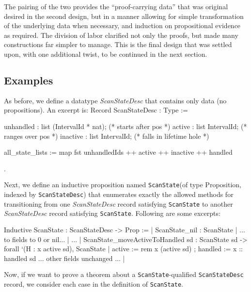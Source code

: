 \documentclass{llncs}
\newenvironment{MyCoqUneval}{\small \verbatim}{\endverbatim \normalsize}
\begin{document}
The pairing of the two provides the ``proof-carrying data'' that
was original desired in the second design, but in a manner allowing for simple
transformation of the underlying data when necessary, and induction on
propositional evidence as required.  The division of labor clarified not only
the proofs, but made many constructions far simpler to manage.  This is the
final design that was settled upon, with one additional twist, to be continued
in the next section.

\subsection{Examples}
\label{sec:examplesv3}

As before, we define a datatype \emph{ScanStateDesc} that contains
only data (no propositions). An excerpt is:
\begin{MyCoqUneval}[label=ScanStateDesc v3]
Record ScanStateDesc : Type := {
    unhandled : list (IntervalId * nat);   (* starts after pos *)
    active    : list IntervalId;           (* ranges over pos *)
    inactive  : list IntervalId;           (* falls in lifetime hole *)

    all_state_lists := map fst unhandledIds ++
                       active ++ inactive ++ handled
}.
\end{MyCoqUneval}

Next, we define an inductive proposition named \texttt{ScanState}(of type
Proposition, indexed by \texttt{ScanStateDesc}) that enumerates exactly the
allowed methods for transitioning from one \emph{ScanStateDesc} record
satisfying \texttt{ScanState} to another \emph{ScanStateDesc} record
satisfying \texttt{ScanState}. Following are some excerpts:

\begin{MyCoqUneval}[label=ScanState Prop]
Inductive ScanState : ScanStateDesc -> Prop :=
  | ScanState_nil :
    ScanState
      {| ... to fields to 0 or nil... |}
...
  | ScanState_moveActiveToHandled sd :
    ScanState sd -> forall `(H : x \in active sd),
    ScanState
      {| active           := rem x (active sd)
       ; handled          := x :: handled sd
         ... other fields unchanged ... |}
\end{MyCoqUneval}
     
Now, if we want to prove a theorem about a \texttt{ScanState}-qualified
\texttt{ScanStateDesc} record, we consider each case in the definition of
\texttt{ScanState}.

% 
\end{document}
